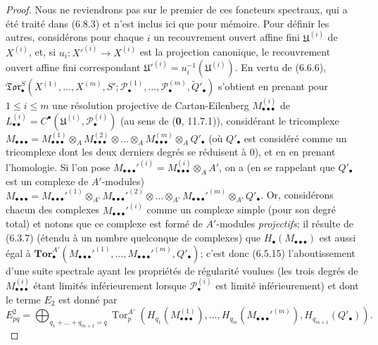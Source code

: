 \begin{proof}
Nous ne reviendrons pas sur le premier de ces foncteurs spectraux, qui a été
traité dans (6.8.3) et n'est inclus ici que pour mémoire. Pour définir les
autres, considérons pour chaque $i$ un recouvrement ouvert affine fini
$\mathfrak U^{(i)}$ de $X^{(i)}$, et, si
$u_i:X'^{(i)}\to X^{(i)}$ est la projection canonique, le recouvrement ouvert
affine fini correspondant
$\mathfrak U'^{(i)}=u_i^{-1}(\mathfrak U^{(i)})$.
En vertu de (6.6.6),
$\mathfrak{Tor}_\bullet^S(X^{(1)},\ldots,X^{(m)},S';
\mathscr P_\bullet^{(1)},\ldots,\mathscr P_\bullet^{(m)},
\widetilde{Q}'_\bullet)$ s'obtient en prenant pour $1\leq i\leq m$ une
résolution projective de Cartan-Eilenberg
$M_{\bullet\bullet\bullet}^{(i)}$ de
$L_{\bullet\bullet}^{(i)}=C^\bullet(\mathfrak U^{(i)},
\mathscr P_\bullet^{(i)})$ (au sens de (\textbf{0}, 11.7.1)), considérant le
tricomplexe
$M_{\bullet\bullet\bullet}
=M_{\bullet\bullet\bullet}^{(1)}\otimes_A
M_{\bullet\bullet\bullet}^{(2)}\otimes\ldots\otimes_A
M_{\bullet\bullet\bullet}^{(m)}\otimes_A Q'_\bullet$
(où $Q'_\bullet$ est considéré comme un tricomplexe dont les deux derniers
degrés se réduisent à $0$), et en en prenant l'homologie. Si l'on pose
$M_{\bullet\bullet\bullet}'^{(i)}=
M_{\bullet\bullet\bullet}^{(i)}\otimes_A A'$, on a (en se rappelant que
$Q'_\bullet$ est un complexe de $A'$-modules)
$M_{\bullet\bullet\bullet}
=M_{\bullet\bullet\bullet}'^{(1)}\otimes_{A'}
M_{\bullet\bullet\bullet}'^{(2)}\otimes\ldots\otimes_{A'}
M_{\bullet\bullet\bullet}'^{(m)}\otimes_{A'} Q'_\bullet$.
Or, considérons chacun des complexes
$M_{\bullet\bullet\bullet}'^{(i)}$ comme un complexe simple (pour son degré
total) et notons que ce complexe est formé de $A'$-modules \emph{projectifs}; il
résulte de (6.3.7) (étendu à un nombre quelconque de complexes) que
$H_\bullet(M_{\bullet\bullet\bullet})$ est aussi égal à
$\mathbf{Tor}_\bullet^{A'}
(M_{\bullet\bullet\bullet}'^{(1)},\ldots,
M_{\bullet\bullet\bullet}'^{(m)},Q'_\bullet)$;
c'est donc (6.5.15) l'aboutissement d'une suite spectrale ayant les propriétés
de régularité voulues (les trois degrés de
$M_{\bullet\bullet\bullet}^{(i)}$ étant limités inférieurement lorsque
$\mathscr P_\bullet^{(i)}$ est limité inférieurement) et dont le terme $E_2$
est donné par
\[
  E_{pq}^2
  =\bigoplus_{q_1+\ldots+q_{m+1}=q}
  \operatorname{Tor}_p^{A'}
  (H_{q_1}(M_{\bullet\bullet\bullet}^{(1)}),\ldots,
   H_{q_m}(M_{\bullet\bullet\bullet}'^{(m)}),H_{q_{m+1}}(Q'_\bullet)).
\]


\end{proof}
